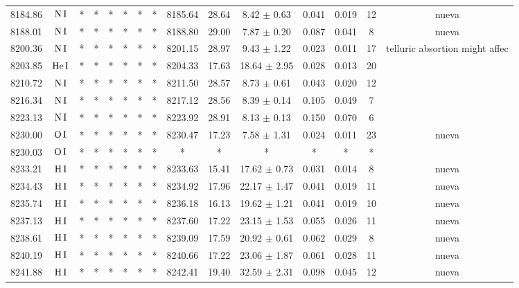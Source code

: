 \documentclass{article}
\begin{document}
\begin{table*}
\begin{adjustbox}{width=\textwidth}
\begin{tabular}{ccccccccccccccc}
8184.86 & $\mbox{N}\thinspace \mbox{I}$ & * & * & * & * & * & * & 8185.64 & 28.64 & 8.42 $\pm$ 0.63 & 0.041 & 0.019 & 12 &  nueva \\
8188.01 & $\mbox{N}\thinspace \mbox{I}$ & * & * & * & * & * & * & 8188.80 & 29.00 & 7.87 $\pm$ 0.20 & 0.087 & 0.041 & 8 &  nueva \\
8200.36 & $\mbox{N}\thinspace \mbox{I}$ & * & * & * & * & * & * & 8201.15 & 28.97 & 9.43 $\pm$ 1.22 & 0.023 & 0.011 & 17 &  telluric absortion might affec \\
8203.85 & $\mbox{He}\thinspace \mbox{I}$ & * & * & * & * & * & * & 8204.33 & 17.63 & 18.64 $\pm$ 2.95 & 0.028 & 0.013 & 20 &  \\
8210.72 & $\mbox{N}\thinspace \mbox{I}$ & * & * & * & * & * & * & 8211.50 & 28.57 & 8.73 $\pm$ 0.61 & 0.043 & 0.020 & 12 &  \\
8216.34 & $\mbox{N}\thinspace \mbox{I}$ & * & * & * & * & * & * & 8217.12 & 28.56 & 8.39 $\pm$ 0.14 & 0.105 & 0.049 & 7 &  \\
8223.13 & $\mbox{N}\thinspace \mbox{I}$ & * & * & * & * & * & * & 8223.92 & 28.91 & 8.13 $\pm$ 0.13 & 0.150 & 0.070 & 6 &  \\
8230.00 & $\mbox{O}\thinspace \mbox{I}$ & * & * & * & * & * & * & 8230.47 & 17.23 & 7.58 $\pm$ 1.31 & 0.024 & 0.011 & 23 &  nueva \\
8230.03 & $\mbox{O}\thinspace \mbox{I}$ & * & * & * & * & * & * & * & * & * & * & * & * &  \\
8233.21 & $\mbox{H}\thinspace \mbox{I}$ & * & * & * & * & * & * & 8233.63 & 15.41 & 17.62 $\pm$ 0.73 & 0.031 & 0.014 & 8 &  nueva \\
8234.43 & $\mbox{H}\thinspace \mbox{I}$ & * & * & * & * & * & * & 8234.92 & 17.96 & 22.17 $\pm$ 1.47 & 0.041 & 0.019 & 11 &  nueva \\
8235.74 & $\mbox{H}\thinspace \mbox{I}$ & * & * & * & * & * & * & 8236.18 & 16.13 & 19.62 $\pm$ 1.21 & 0.041 & 0.019 & 10 &  nueva \\
8237.13 & $\mbox{H}\thinspace \mbox{I}$ & * & * & * & * & * & * & 8237.60 & 17.22 & 23.15 $\pm$ 1.53 & 0.055 & 0.026 & 11 &  nueva \\
8238.61 & $\mbox{H}\thinspace \mbox{I}$ & * & * & * & * & * & * & 8239.09 & 17.59 & 20.92 $\pm$ 0.61 & 0.062 & 0.029 & 8 &  nueva \\
8240.19 & $\mbox{H}\thinspace \mbox{I}$ & * & * & * & * & * & * & 8240.66 & 17.22 & 23.06 $\pm$ 1.87 & 0.061 & 0.028 & 11 &  nueva \\
8241.88 & $\mbox{H}\thinspace \mbox{I}$ & * & * & * & * & * & * & 8242.41 & 19.40 & 32.59 $\pm$ 2.31 & 0.098 & 0.045 & 12 &  nueva \\

\end{tabular}
\end{adjustbox}
\end{table*}
\end{document}
